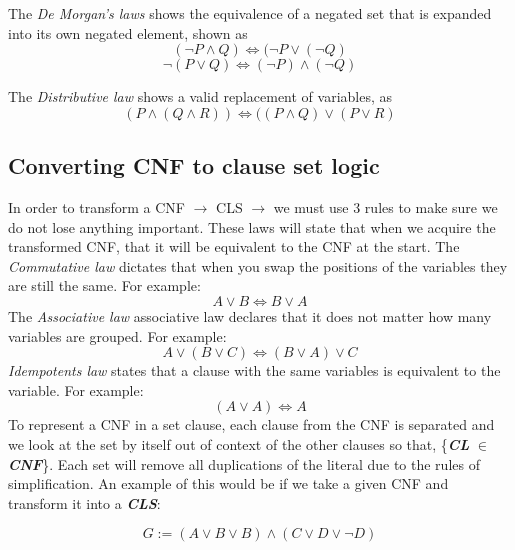 \documentclass[11pt,a4paper]{report}
\begin{document}
The \emph{De Morgan's laws} shows the equivalence of a negated set that is expanded into its own negated element, shown as
\begin{displaymath}
(\neg P \land Q) \Leftrightarrow (\neg P \lor (\neg Q)
\end{displaymath}  
\begin{displaymath}
\neg(P \lor Q) \Leftrightarrow (\neg P) \land (\neg Q)
\end{displaymath}


The \emph{Distributive law} shows a valid replacement of variables, as
\begin{displaymath}
(P \land (Q \land R)) \Leftrightarrow ((P \land Q) \lor (P \lor R)
\end{displaymath}


\subsection{Converting CNF to clause set logic}
In order to transform a CNF $\rightarrow$ CLS $\rightarrow$ we must use 3 rules to make sure we do not lose anything important. These laws will state that when we acquire the transformed CNF, that it will be equivalent to the CNF at the start. 
The \emph{Commutative law} dictates that when you swap the positions of the variables they are still the same. For example:
\begin{displaymath}
A \lor B \Leftrightarrow B \lor A
\end{displaymath}
The \emph{Associative law} associative law declares that it does not matter how many variables are grouped. For example:
\begin{displaymath}
A \lor (B \lor C) \Leftrightarrow (B \lor A) \lor C
\end{displaymath}
\emph{Idempotents law} states that a clause with the same variables is equivalent to the variable. For example:
\begin{displaymath}
(A \lor A) \Leftrightarrow A
\end{displaymath}
To represent a CNF in a set clause, each clause from the CNF is separated and we look at the set by itself out of context of the other clauses so that, \{\textbf{\textit{CL}} $\in$ \textbf{\textit{CNF}}\}. Each set will remove all duplications of the literal due to the rules of simplification. An example of this would be if we take a given CNF and transform it into a \textbf{\textit{CLS}}: 

\begin{displaymath}
G:= (A \lor B \lor B) \land (C \lor D \lor \neg D)
\end{displaymath}
\end{document}

